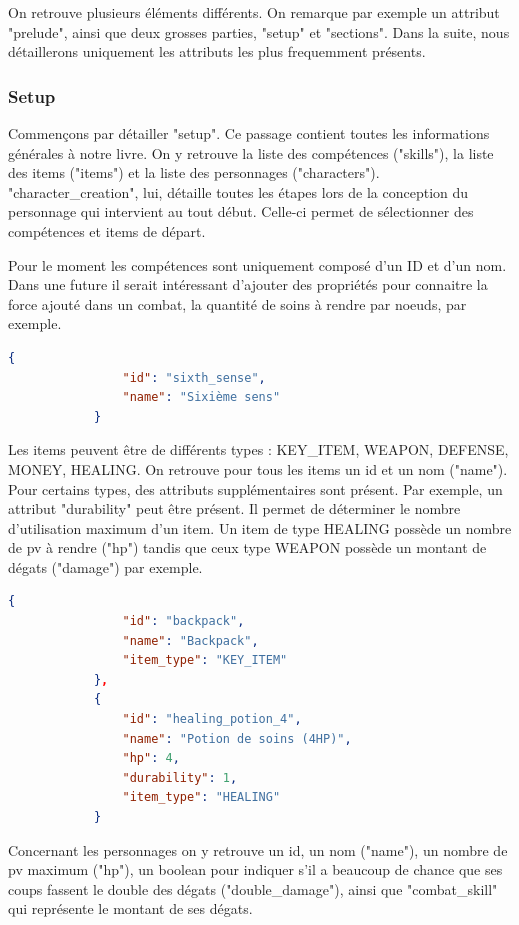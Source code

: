 		On retrouve plusieurs éléments différents. On remarque par exemple un attribut "prelude", ainsi que deux grosses parties, "setup" et "sections". Dans la suite, nous détaillerons uniquement les attributs les plus frequemment présents.

		\subsubsection{Setup}

			Commençons par détailler "setup". Ce passage contient toutes les informations générales à notre livre. On y retrouve la liste des compétences ("skills"), la liste des items ("items") et la liste des personnages ("characters"). "character\_creation", lui, détaille toutes les étapes lors de la conception du personnage qui intervient au tout début. Celle-ci permet de sélectionner des compétences et items de départ.

			Pour le moment les compétences sont uniquement composé d'un ID et d'un nom. Dans une future \maj{} il serait intéressant d'ajouter des propriétés pour connaitre la force ajouté dans un combat, la quantité de soins à rendre par noeuds, par exemple.

			\begin{lstlisting}[gobble=12, language=json, caption=Exemple de compétence]
			{
				"id": "sixth_sense",
				"name": "Sixième sens"
			}
			\end{lstlisting}

			Les items peuvent être de différents types : KEY\_ITEM, WEAPON, DEFENSE, MONEY, HEALING. On retrouve pour tous les items un id et un nom ("name"). Pour certains types, des attributs supplémentaires sont présent. Par exemple, un attribut "durability" peut être présent. Il permet de déterminer le nombre d'utilisation maximum d'un item. Un item de type HEALING possède un nombre de pv à rendre ("hp") tandis que ceux type WEAPON possède un montant de dégats ("damage") par exemple.

			\begin{lstlisting}[gobble=12, language=json, caption=Exemple d'items]
			{
				"id": "backpack",
				"name": "Backpack",
				"item_type": "KEY_ITEM"
			},
			{
				"id": "healing_potion_4",
				"name": "Potion de soins (4HP)",
				"hp": 4,
				"durability": 1,
				"item_type": "HEALING"
			}
			\end{lstlisting}

			Concernant les personnages on y retrouve un id, un nom ("name"), un nombre de pv maximum ("hp"), un boolean pour indiquer s'il a beaucoup de chance que ses coups fassent le double des dégats ("double\_damage"), ainsi que "combat\_skill" qui représente le montant de ses dégats.

